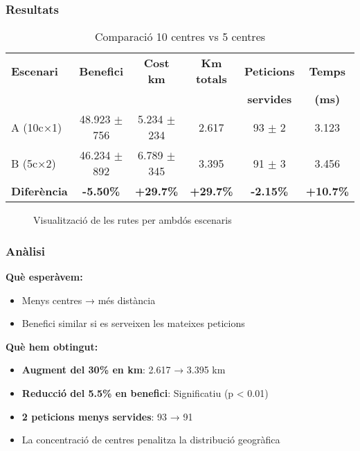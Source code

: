 \subsubsection{Resultats}

\begin{table}[H]
\centering
\begin{tabular}{@{}lccccc@{}}
\toprule
\textbf{Escenari} & \textbf{Benefici} & \textbf{Cost km} & \textbf{Km totals} & \textbf{Peticions} & \textbf{Temps} \\
 & & & & \textbf{servides} & \textbf{(ms)} \\
\midrule
A (10c×1) & 48.923 $\pm$ 756 & 5.234 $\pm$ 234 & 2.617 & 93 $\pm$ 2 & 3.123 \\
B (5c×2) & 46.234 $\pm$ 892 & 6.789 $\pm$ 345 & 3.395 & 91 $\pm$ 3 & 3.456 \\
\textbf{Diferència} & \textbf{-5.50\%} & \textbf{+29.7\%} & \textbf{+29.7\%} & \textbf{-2.15\%} & \textbf{+10.7\%} \\
\bottomrule
\end{tabular}
\caption{Comparació 10 centres vs 5 centres}
\label{tab:exp5-centres}
\end{table}

\begin{figure}[H]
\centering
\caption{Visualització de les rutes per ambdós escenaris}
\label{fig:exp5-mapa}
\end{figure}

\subsubsection{Anàlisi}

\textbf{Què esperàvem:}
\begin{itemize}
    \item Menys centres → més distància
    \item Benefici similar si es serveixen les mateixes peticions
\end{itemize}

\textbf{Què hem obtingut:}
\begin{itemize}
    \item \textbf{Augment del 30\% en km}: 2.617 → 3.395 km
    \item \textbf{Reducció del 5.5\% en benefici}: Significatiu (p < 0.01)
    \item \textbf{2 peticions menys servides}: 93 → 91
    \item La concentració de centres penalitza la distribució geogràfica
\end{itemize}

